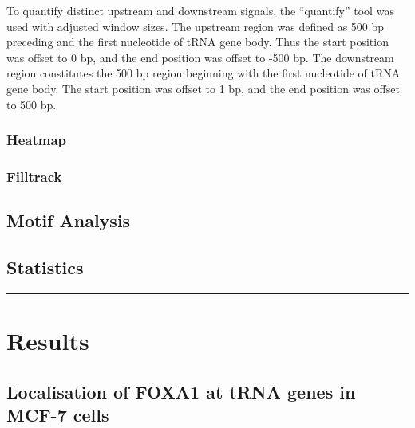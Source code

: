 \documentclass[
  12pt,
]{article}
\begin{document}
To quantify distinct upstream and downstream signals, the ``quantify'' tool was used with adjusted window sizes.
The upstream region was defined as 500 bp preceding and the first nucleotide of tRNA gene body.
Thus the start position was offset to 0 bp, and the end position was offset to -500 bp.
The downstream region constitutes the 500 bp region beginning with the first nucleotide of tRNA gene body.
The start position was offset to 1 bp, and the end position was offset to 500 bp.

\hypertarget{heatmap}{%
\subsubsection{Heatmap}\label{heatmap}}

\hypertarget{filltrack}{%
\subsubsection{Filltrack}\label{filltrack}}

\hypertarget{motif-analysis}{%
\subsection{Motif Analysis}\label{motif-analysis}}

\hypertarget{statistics}{%
\subsection{Statistics}\label{statistics}}

\begin{center}\rule{0.5\linewidth}{0.5pt}\end{center}

\hypertarget{results}{%
\section{Results}\label{results}}

\hypertarget{localisation-of-foxa1-at-trna-genes-in-mcf-7-cells}{%
\subsection{Localisation of FOXA1 at tRNA genes in MCF-7 cells}\label{localisation-of-foxa1-at-trna-genes-in-mcf-7-cells}}
\end{document}
